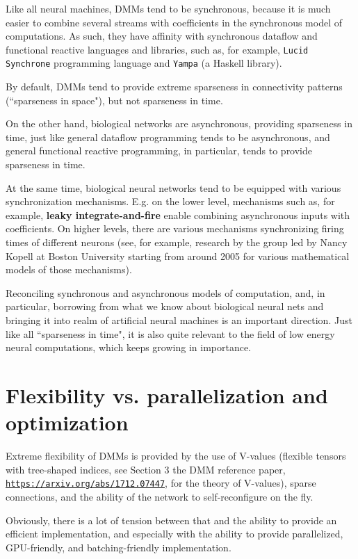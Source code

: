 \documentclass{article}
\begin{document}
Like all neural machines, DMMs tend to be synchronous, because it is much easier to combine
several streams with coefficients in the synchronous model of computations. As such, they have affinity with
synchronous dataflow and functional reactive languages and libraries, such as, for example,
{\tt Lucid Synchrone} programming language and {\tt Yampa} (a Haskell library).

By default, DMMs tend to provide extreme sparseness in connectivity patterns (``sparseness in space"),
but not sparseness in time. 

On the other hand, biological networks are asynchronous, providing sparseness in time, just like
general dataflow programming tends to be asynchronous, and general functional reactive programming,
in particular, tends to provide sparseness in time.

At the same time, biological neural networks tend to be equipped with various synchronization mechanisms.
E.g. on the lower level, mechanisms such as, for example, {\bf leaky integrate-and-fire} enable combining
asynchronous inputs with coefficients. On higher levels, there are various mechanisms synchronizing firing times
of different neurons (see, for example, research by the group led by Nancy Kopell at Boston University starting from
around 2005 for various mathematical models of those mechanisms).

Reconciling synchronous and asynchronous models of computation, and, in particular, borrowing from
what we know about biological neural nets and bringing it into realm of artificial neural machines is
an important direction. Just like all ``sparseness in time", it is also quite relevant to the field of low energy
neural computations, which keeps growing in importance.

\section{Flexibility vs. parallelization and optimization} 

Extreme flexibility of DMMs is provided by the use of V-values (flexible tensors with tree-shaped indices, 
see Section 3 the DMM reference paper, \href{https://arxiv.org/abs/1712.07447}{\tt https://arxiv.org/abs/1712.07447}, for
the theory of V-values),
sparse connections, and the ability of the network to self-reconfigure on the fly.

Obviously, there is a lot of tension between that and the ability to provide an efficient implementation,
and especially with the ability to provide parallelized, GPU-friendly, and batching-friendly implementation.
\end{document}
